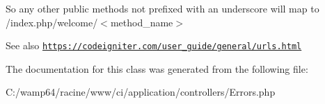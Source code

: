 So any other public methods not prefixed with an underscore will map to /index.php/welcome/$<$method\+\_\+name$>$ \begin{DoxySeeAlso}{See also}
\href{https://codeigniter.com/user_guide/general/urls.html}{\tt https\+://codeigniter.\+com/user\+\_\+guide/general/urls.\+html} 
\end{DoxySeeAlso}


The documentation for this class was generated from the following file\+:\begin{DoxyCompactItemize}
\item 
C\+:/wamp64/racine/www/ci/application/controllers/Errors.\+php\end{DoxyCompactItemize}
